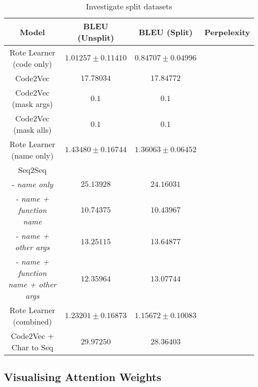 
\begin{table}[h!]
\begin{center}
\begin{tabular}{ c | c | c | c }
    Model                             & BLEU (Unsplit)  & BLEU (Split)    & Perpelexity \\
    \hline
    Rote Learner  (code only)         & $ 1.01257 \pm  0.11410 $ & $ 0.84707 \pm 0.04996 $ & \\
    Code2Vec                          & $ 17.78034 $ & $ 17.84772 $ & \\
    Code2Vec  (mask args)             & $ 0.1 $ & $ 0.1$ & \\
    Code2Vec  (mask alls)             & $ 0.1 $ & $ 0.1 $ & \\
    \hline
    \hline
    Rote Learner  (name only)         & $ 1.43480 \pm  0.16744 $ & $ 1.36063 \pm 0.06452 $ & \\
    \hline
    Seq2Seq                             & &  & \\
     - \textit{name only}               & $ 25.13928 $ & $ 24.16031 $ & \\
    - \textit{name + function name}     & $ 10.74375 $ & $ 10.43967 $ & \\
    - \textit{name + other args}        & $ 13.25115 $ & $ 13.64877 $ & \\
    - \textit{name + function name + other args}    & $ 12.35964 $ & $ 13.07744 $ &  \\
    \hline
    \hline
    Rote Learner (combined)            & $ 1.23201 \pm  0.16873 $ & $ 1.15672 \pm 0.10083 $ & \\
    Code2Vec  + Char to Seq            & $ 29.97250 $ & $ 28.36403 $ & \\
    \hline
\end{tabular}
\caption {Investigate split datasets}
\label{table:split_datasets_embed}
\end{center}
\end{table}


\subsection{Visualising Attention Weights} %
\label{sub:visualising_attention_weights}

